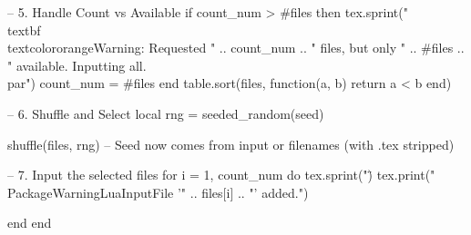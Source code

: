 \begin{luacode*}
    -- 5. Handle Count vs Available
    if count_num > #files then
        tex.sprint("\\textbf{\\textcolor{orange}{Warning: Requested " .. count_num .. " files, but only " .. #files .. " available. Inputting all.}}\\par")
        count_num = #files
    end
    table.sort(files, function(a, b) return a < b end)

    -- 6. Shuffle and Select
    local rng = seeded_random(seed)

    shuffle(files, rng) -- Seed now comes from input or filenames (with .tex stripped)

    -- 7. Input the selected files
    for i = 1, count_num do
        tex.sprint("\")
		 tex.print("\\PackageWarning{LuaInput}{File '" .. files[i] .. "' added.}")

    end
end
\end{luacode*}